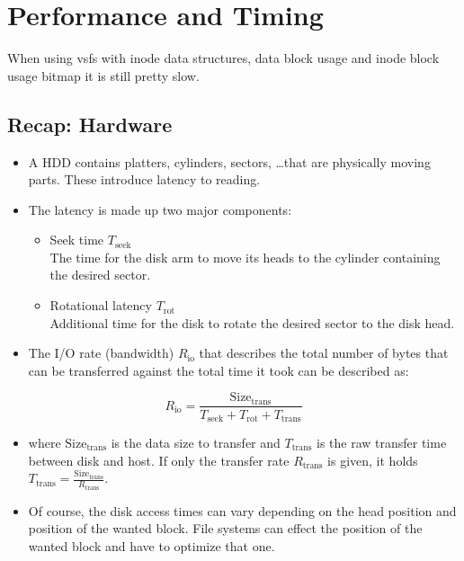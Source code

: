 \documentclass[a4paper, 11pt, accentcolor = tud3b]{tudreport}
\begin{document}
        \section{Performance and Timing}
	        When using vsfs with inode data structures, data block usage and inode block usage bitmap it is still pretty slow.
	        
	        \subsection{Recap: Hardware}
		        \begin{itemize}
		        	\item A HDD contains platters, cylinders, sectors, \dots that are physically moving parts. These introduce latency to reading.
		        	\item The latency is made up two major components:
			        	\begin{itemize}
			        		\item Seek time \( T_\textrm{seek} \) \\ The time for the disk arm to move its heads to the cylinder containing the desired sector.
			        		\item Rotational latency \( T_\textrm{rot} \) \\ Additional time for the disk to rotate the desired sector to the disk head.
			        	\end{itemize}
		        	\item The I/O rate (bandwidth) \(R_\textrm{io}\) that describes the total number of bytes that can be transferred against the total time it took can be described as:
		        \end{itemize}
			        	\begin{equation*}
				        	R_\textrm{io} = \frac{\textrm{Size}_\textrm{trans}}{T_\textrm{seek} + T_\textrm{rot} + T_\textrm{trans}}
			        	\end{equation*}
			    \begin{itemize}
			        	\item[] where \(\textrm{Size}_\textrm{trans}\) is the data size to transfer and \(T_\textrm{trans}\) is the raw transfer time between disk and host. If only the transfer rate \(R_\textrm{trans}\) is given, it holds \( T_\textrm{trans} = \frac{\textrm{Size}_\textrm{trans}}{R_\textrm{trans}} \).
			        	\item Of course, the disk access times can vary depending on the head position and position of the wanted block. File systems can effect the position of the wanted block and have to optimize that one.
		        \end{itemize}
	        
\end{document}
